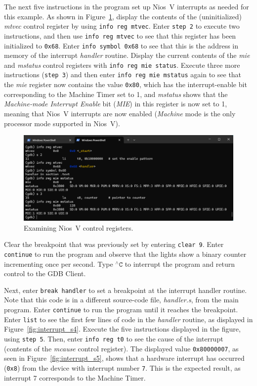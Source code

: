\documentclass[11pt, twoside, pdftex]{article}
\newcommand{\red}[1]{{\color{red}\sf{#1}}}
\begin{document}
The next five instructions in the program set up Nios~V interrupts as needed for this
example. As shown in Figure~\ref{fig:interrupt_s3}, display
the contents of the (uninitialized) {\it mtvec} control register by using
\texttt{info reg mtvec}. Enter \texttt{step 2} to execute two instructions, and
then use \texttt{info reg mtvec} to see that this register has been initialized to
\texttt{0x68}. Enter \texttt{info symbol 0x68} to see that this is the address in memory of the 
interrupt {\it handler} routine. 
Display the current contents of the {\it mie} and {\it mstatus} control registers
with \texttt{info reg mie status}. Execute three more instructions (\texttt{step 3}) and
then enter \texttt{info reg mie mstatus} again to see that the {\it mie} register now
contains the value \texttt{0x80}, which has the interrupt-enable bit corresponding to the
Machine Timer set to 1, and {\it mstatus} shows that the {\it Machine-mode Interrupt Enable} bit
({\it MIE}) in this register is now set to 1, meaning that Nios~V interrupts are now
enabled ({\it Machine} mode is the only processor mode supported in Nios~V).

\begin{figure}[h]
    \begin{center}
        \includegraphics[scale=.6]{figures/interrupt_s3.png}
        \caption{Examining Nios~V control registers.}
        \label{fig:interrupt_s3}
    \end{center}
\end{figure}

Clear the breakpoint that was previously set by entering \texttt{clear 9}. 
Enter \texttt{continue} to run the program and observe that the \red{{\it LEDR}} lights
show a binary counter incrementing once per second. Type $^{\wedge}\texttt{C}$ to
interrupt the program and return control to the GDB Client.

Next, enter \texttt{break handler} to set a breakpoint at the interrupt handler routine.
Note that this code is in a different source-code file, {\it handler.s}, from the main program.
Enter \texttt{continue} to run the program until it reaches the breakpoint. Enter
\texttt{list} to see the first few lines of code in the {\it handler} routine, as displayed in
Figure~\ref{fig:interrupt_s4}. Execute the five instructions displayed in the figure, using
\texttt{step 5}. Then, enter \texttt{info reg t0} to see the cause of the interrupt
(contents of the {\it mcause} control register). The displayed value \texttt{0x80000007}, as 
seen in Figure~\ref{fig:interrupt_s5}, shows that a hardware interrupt has occurred (\texttt{0x8})
from the device with interrupt number \texttt{7}. This is the expected result, as
interrupt 7 corresponds to the Machine Timer. 
\end{document}
